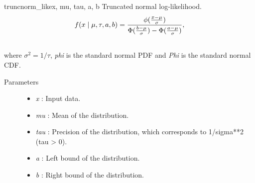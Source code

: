 \hypertarget{pymc.distributions.truncnorm_like}{}\begin{funcdesc}{truncnorm\_like}{x, mu, tau, a, b}
Truncated normal log-likelihood.
\begin{gather}
\begin{split}f(x \mid \mu, \tau, a, b) = \frac{\phi(\frac{x-\mu}{\sigma})} {\Phi(\frac{b-\mu}{\sigma}) - \Phi(\frac{a-\mu}{\sigma})},\end{split}\notag\\\begin{split}\end{split}\notag
\end{gather}
where $\sigma^2=1/\tau$, \emph{phi} is the standard normal PDF and \emph{Phi} is the standard normal CDF.
\begin{description}
\item[Parameters] \leavevmode\begin{itemize}
\item {}
\emph{x} : Input data.

\item {}
\emph{mu} : Mean of the distribution.

\item {}
\emph{tau} : Precision of the distribution, which corresponds to 1/sigma**2 (tau \textgreater{} 0).

\item {}
\emph{a} : Left bound of the distribution.

\item {}
\emph{b} : Right bound of the distribution.

\end{itemize}

\end{description}
\end{funcdesc}

